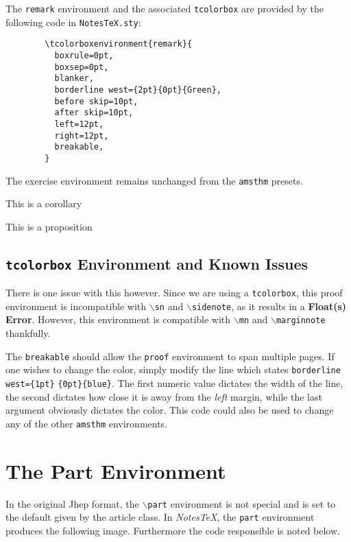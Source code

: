 \documentclass[10pt]{article}
\begin{document}
	\begin{remark}
		The \texttt{remark} environment and the associated \texttt{tcolorbox} are provided by the following code in \texttt{NotesTeX.sty}:
		\begin{verbatim}
		\tcolorboxenvironment{remark}{
		  boxrule=0pt,
		  boxsep=0pt,
		  blanker,
		  borderline west={2pt}{0pt}{Green},
		  before skip=10pt,
		  after skip=10pt,
		  left=12pt,
		  right=12pt,
		  breakable,
		}
		\end{verbatim}
	\end{remark}
	\begin{exercise}
		The exercise environment remains unchanged from the \texttt{amsthm} presets.
	\end{exercise}
	\begin{corollary}
		This is a corollary
	\end{corollary}
	\begin{proposition}
		This is a proposition
	\end{proposition}



	\subsection{\texttt{tcolorbox} Environment and Known Issues} %
	\label{ssub:tcolorbox environments_and_known_issues}
	
	There is one issue with this however. Since we are using a \texttt{tcolorbox}, this proof environment is incompatible with \texttt{$\backslash$sn} and \texttt{$\backslash$sidenote}, as it results in a \textbf{Float(s) Error}. However, this environment is compatible with \texttt{$\backslash$mn} and \texttt{$\backslash$marginnote} thankfully.


	The \texttt{breakable} should allow the \texttt{proof} environment to span multiple pages. If one wishes to change the color, simply modify the line which states \texttt{borderline west=\{1pt\}} \texttt{\{0pt\}\{blue\}}. The first numeric value dictates the width of the line, the second dictates how close it is away from the \textit{left} margin, while the last argument obviously dictates the color. This code could also be used to change any of the other \texttt{amsthm} environments.


	\section{The Part Environment}\label{sec:part}
	In the original Jhep format, the \texttt{$\backslash$part} environment is not special and is set to the default given by the article class. In \textit{NotesTeX}, the \texttt{part} environment produces the following image. Furthermore the code responsible is noted below.\\
\end{document}
